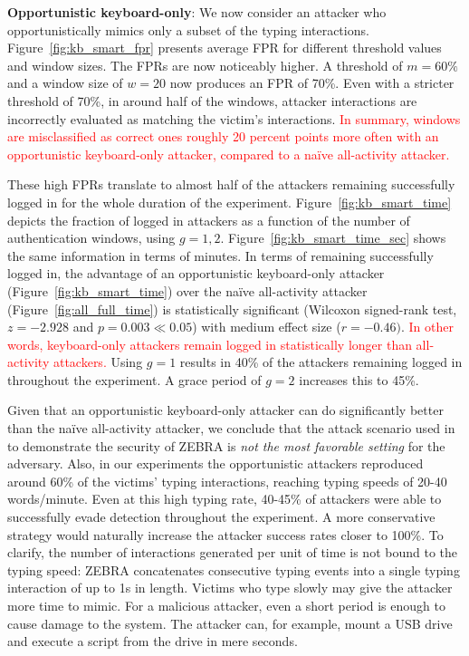 \documentclass[conference]{IEEEtran}
\newcommand{\zebra}{ZEBRA\xspace}
\newcommand{\KBactivity}{keyboard-only\xspace}
\newcommand{\allactivity}{all-activity\xspace}
\newcommand\changeMika[1]{\textcolor{red}{#1}}
\newcommand\changeMika[1]{{#1}}
\begin{document}
\vspace{1mm}
\noindent
\textbf{Opportunistic \KBactivity}:
We now consider an attacker who opportunistically mimics only a subset of the typing interactions. Figure~\ref{fig:kb_smart_fpr} presents average FPR for different threshold values and window sizes. The FPRs are now noticeably higher. A threshold of $m=60\%$ and a window size of $w=20$ now produces an FPR of 70\%. Even with a stricter threshold of 70\%, in around half of the windows, attacker interactions are incorrectly evaluated as matching the victim's interactions. \changeMika{In summary, windows are misclassified as correct ones roughly 20 percent points more often with an opportunistic \KBactivity attacker, compared to a na\"ive \allactivity attacker.}

These high FPRs translate to almost half of the attackers remaining successfully logged in for the whole duration of the experiment. Figure~\ref{fig:kb_smart_time} depicts the fraction of logged in attackers as a function of the number of authentication windows, using $g=1,2$. Figure~\ref{fig:kb_smart_time_sec} shows the same information in terms of minutes. In terms of remaining successfully logged in, the advantage of an opportunistic \KBactivity attacker (Figure~\ref{fig:kb_smart_time}) over the na\"ive \allactivity attacker (Figure~\ref{fig:all_full_time}) is statistically significant
(Wilcoxon signed-rank test, $z=-2.928$ and $p=0.003 \ll 0.05$) with medium
effect size ($r=-0.46)$. 
\changeMika{In other words, \KBactivity attackers remain logged in statistically longer than \allactivity attackers.}
Using $g=1$ results in 40\% of the attackers remaining logged in throughout the experiment. A grace period of $g=2$ increases this to 45\%.

Given that an opportunistic \KBactivity attacker can do significantly better than the na\"ive \allactivity attacker, we conclude that the attack scenario used in \cite{mare2014zebra} to demonstrate the security of \zebra is \textit{not the most favorable setting} for the adversary. Also, in our experiments the opportunistic attackers reproduced around 60\% of the victims' typing interactions, reaching typing speeds of 20-40 words/minute. Even at this high typing rate, 40-45\% of attackers were able to successfully evade detection throughout the experiment. A more conservative strategy would naturally increase the attacker success rates closer to 100\%.
To clarify, the number of interactions generated per unit of time is not bound to the typing speed: \zebra concatenates consecutive typing events into a single typing interaction of up to 1s in length. Victims who type slowly may give the attacker more time to mimic. For a malicious attacker, even a short period is enough to cause damage to the system. The attacker can, for example, mount a USB drive and execute a script from the drive in mere seconds.
\end{document}
